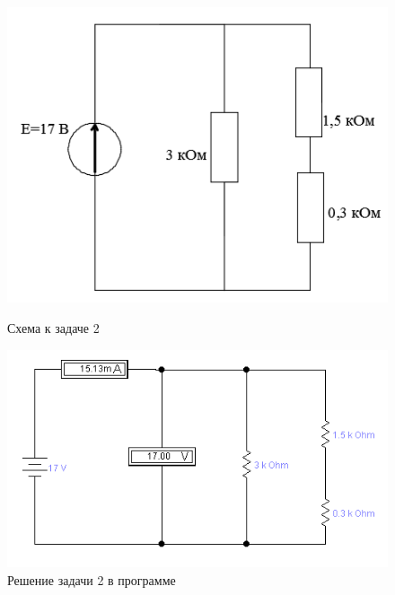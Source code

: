 \begin{figure}[H]
\begin{changemargin}{-1.5cm}{-2cm}
  \begin{center}
    \begin{minipage}[h]{0.4\linewidth}
        \includegraphics[width=1\textwidth]{authors/stepanuk-2-fig-3.png}
        \caption{Схема к задаче 2}
        \label{fig:stepanuk-2-fig-3}
    \end{minipage}
\hfill
    \begin{minipage}[h]{0.5\linewidth}
        \includegraphics[width=1\textwidth]{authors/stepanuk-2-fig-4.png}
        \caption{Решение задачи 2 в программе}
        \label{fig:stepanuk-2-fig-4}
    \end{minipage}


  \end{center}
\end{changemargin}

\end{figure}
